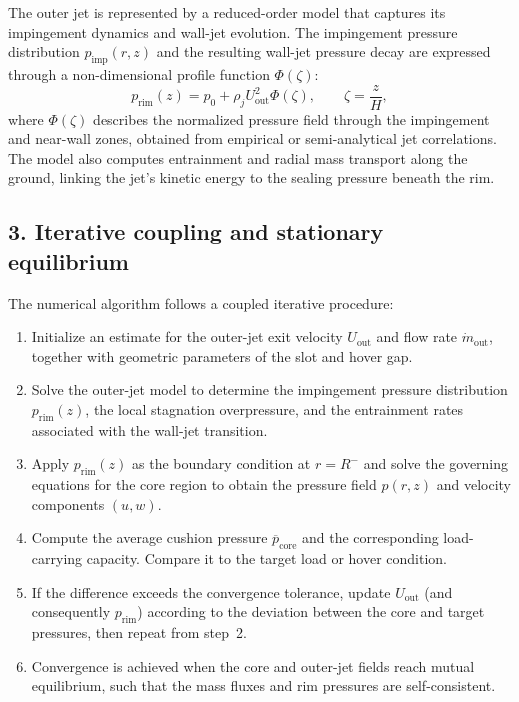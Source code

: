 \documentclass[11pt,a4paper]{article}
\begin{document}
The outer jet is represented by a reduced-order model that captures its impingement dynamics and wall-jet evolution. The impingement pressure distribution $p_\text{imp}(r,z)$ and the resulting wall-jet pressure decay are expressed through a non-dimensional profile function $\Phi(\zeta)$:
\begin{equation}
p_\text{rim}(z) = p_0 + \rho_j U_{\text{out}}^2 \Phi(\zeta),
\qquad \zeta = \frac{z}{H},
\end{equation}
where $\Phi(\zeta)$ describes the normalized pressure field through the impingement and near-wall zones, obtained from empirical or semi-analytical jet correlations. The model also computes entrainment and radial mass transport along the ground, linking the jet’s kinetic energy to the sealing pressure beneath the rim.

\subsection*{3. Iterative coupling and stationary equilibrium}

The numerical algorithm follows a coupled iterative procedure:
\begin{enumerate}
    \item Initialize an estimate for the outer-jet exit velocity $U_{\text{out}}$ and flow rate $\dot{m}_{\text{out}}$, together with geometric parameters of the slot and hover gap.
    \item Solve the outer-jet model to determine the impingement pressure distribution $p_\text{rim}(z)$, the local stagnation overpressure, and the entrainment rates associated with the wall-jet transition.
    \item Apply $p_\text{rim}(z)$ as the boundary condition at $r = R^-$ and solve the governing equations for the core region to obtain the pressure field $p(r,z)$ and velocity components $(u,w)$.
    \item Compute the average cushion pressure $\overline{p}_{\text{core}}$ and the corresponding load-carrying capacity. Compare it to the target load or hover condition.
    \item If the difference exceeds the convergence tolerance, update $U_{\text{out}}$ (and consequently $p_\text{rim}$) according to the deviation between the core and target pressures, then repeat from step~2.
    \item Convergence is achieved when the core and outer-jet fields reach mutual equilibrium, such that the mass fluxes and rim pressures are self-consistent.
\end{enumerate}
\end{document}
